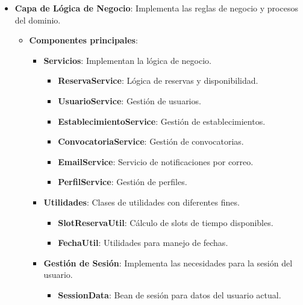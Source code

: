 \begin{itemize}
\begin{itemize}
\begin{itemize}
            \end{itemize}
    \end{itemize}

	\item \textbf{Capa de Lógica de Negocio}: Implementa las reglas de negocio y procesos del dominio.
	\begin{itemize}
       \item \textbf{Componentes principales}: 
       	\begin{itemize}
               \item \textbf{Servicios}: Implementan la lógica de negocio.
           	\begin{itemize}
                   \item \textbf{ReservaService}: Lógica de reservas y disponibilidad.
                   \item \textbf{UsuarioService}: Gestión de usuarios.
                   \item \textbf{EstablecimientoService}: Gestión de establecimientos.
                   \item \textbf{ConvocatoriaService}: Gestión de convocatorias.
                   \item \textbf{EmailService}: Servicio de notificaciones por correo.
                   \item \textbf{PerfilService}: Gestión de perfiles.
                \end{itemize}

               \item \textbf{Utilidades}: Clases de utilidades con diferentes fines.
           	\begin{itemize}
                   \item \textbf{SlotReservaUtil}: Cálculo de slots de tiempo disponibles.
                   \item \textbf{FechaUtil}: Utilidades para manejo de fechas.
                \end{itemize}

               \item \textbf{Gestión de Sesión}: Implementa las necesidades para la sesión del usuario.
           	\begin{itemize}
                   \item \textbf{SessionData}: Bean de sesión para datos del usuario actual.
                \end{itemize}
            \end{itemize}
    \end{itemize}


\end{itemize}
